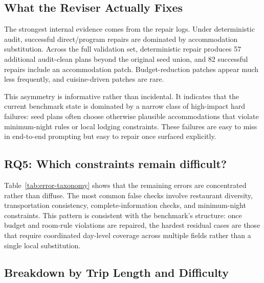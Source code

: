 \documentclass{article}
\begin{document}
\subsection{What the Reviser Actually Fixes}
The strongest internal evidence comes from the repair logs. Under deterministic audit, successful direct/program repairs are dominated by accommodation substitution. Across the full validation set, deterministic repair produces 57 additional audit-clean plans beyond the original seed union, and 82 successful repairs include an accommodation patch. Budget-reduction patches appear much less frequently, and cuisine-driven patches are rare.

This asymmetry is informative rather than incidental. It indicates that the current benchmark state is dominated by a narrow class of high-impact hard failures: seed plans often choose otherwise plausible accommodations that violate minimum-night rules or local lodging constraints. These failures are easy to miss in end-to-end prompting but easy to repair once surfaced explicitly.

\subsection{RQ5: Which constraints remain difficult?}
\begin{table}[t]
    \centering
    \caption{Remaining failure taxonomy for the seeded multi-agent method under our reproduced evaluation protocol. Counts aggregate criterion-level false checks from the benchmark detailed scores, so a single plan may contribute to multiple rows.}
    \label{tab:error-taxonomy}
    \resizebox{0.72\linewidth}{!}{}
\end{table}

Table~\ref{tab:error-taxonomy} shows that the remaining errors are concentrated rather than diffuse. The most common false checks involve restaurant diversity, transportation consistency, complete-information checks, and minimum-night constraints. This pattern is consistent with the benchmark's structure: once budget and room-rule violations are repaired, the hardest residual cases are those that require coordinated day-level coverage across multiple fields rather than a single local substitution.

\subsection{Breakdown by Trip Length and Difficulty}
\begin{table}[t]
    \centering
    \caption{Final Pass Rate by difficulty level (\%, higher is better). Repair-based methods remain stronger than direct prompting across all difficulty groups, with the largest gains on easy and medium instances.}
    \label{tab:difficulty-breakdown}
    \resizebox{0.72\linewidth}{!}{}
\end{table}
\end{document}

